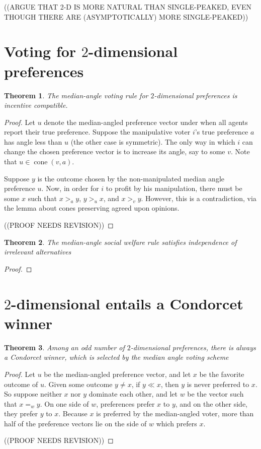 \documentclass[12pt]{article}
\newtheorem{theorem}{Theorem}
\DeclareMathOperator*{\cone}{cone}
\newcommand{\1}[1]{\mathds{1}[{#1}]}
\begin{document}
  ((ARGUE THAT 2-D IS MORE NATURAL THAN SINGLE-PEAKED,
  EVEN THOUGH THERE ARE (ASYMPTOTICALLY) MORE SINGLE-PEAKED))
\section{Voting for $2$-dimensional preferences}

  \begin{theorem}
    The median-angle voting rule for $2$-dimensional preferences
    is incentive compatible.
  \end{theorem}
  \begin{proof}
    Let $u$ denote the median-angled preference vector under when all
    agents report their true preference.
    Suppose the manipulative voter $i$'s true preference $a$
    has angle less than $u$ (the other case is symmetric).
    The only way in which $i$ can change the chosen preference vector
    is to increase its angle, say to some $v$.
    Note that $u \in \cone(v,a)$.

    Suppose $y$ is the outcome chosen by the non-manipulated median
    angle preference $u$.
    Now, in order for $i$ to profit by his manipulation,
    there must be some $x$ such that
    $x >_a y$, $y >_u x$, and $x >_v y$.
    However, this is a contradiction, via the lemma about cones
    preserving agreed upon opinions.

    ((PROOF NEEDS REVISION))
  \end{proof}

  \begin{theorem}
    The median-angle social welfare rule satisfies independence of irrelevant
    alternatives
  \end{theorem}
  \begin{proof}
  \end{proof}

\section{$2$-dimensional entails a Condorcet winner}

  \begin{theorem}\label{thrm:2DCondorcet}
    Among an odd number of $2$-dimensional preferences,
    there is always a Condorcet winner, which is selected
    by the median angle voting scheme
  \end{theorem}
  \begin{proof}
    Let $u$ be the median-angled preference vector, and let
    $x$ be the favorite outcome of $u$.
    Given some outcome $y\ne x$, if $y \ll x$, then
    $y$ is never preferred to $x$.
    So suppose neither $x$ nor $y$ dominate each other, and let
    $w$ be the vector such that $x =_w y$.
    On one side of $w$, preferences prefer $x$ to $y$,
    and on the other side, they prefer $y$ to $x$.
    Because $x$ is preferred by the median-angled voter,
    more than half of the preference vectors lie on the side of $w$
    which prefers $x$.

    ((PROOF NEEDS REVISION))
  \end{proof}
\end{document}
